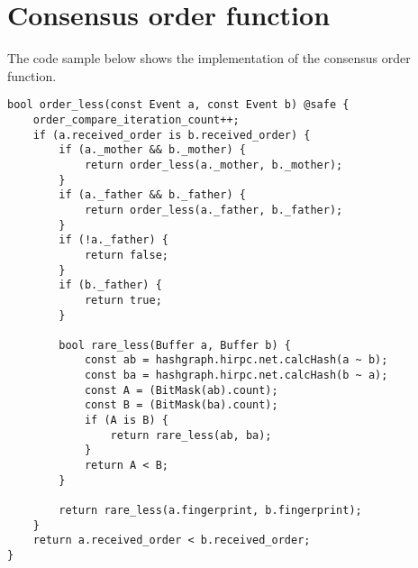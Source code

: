 \section{Consensus order function}\label{sec:order_function}
The code sample below shows the implementation of the consensus order function.
\lstset{language=c++, numbers=left, numberstyle=\tiny, stepnumber=1, numbersep=5pt, tabsize=4}%
\begin{lstlisting}
bool order_less(const Event a, const Event b) @safe {
	order_compare_iteration_count++;
	if (a.received_order is b.received_order) {
		if (a._mother && b._mother) {
			return order_less(a._mother, b._mother);
		}
		if (a._father && b._father) {
			return order_less(a._father, b._father);
		}
		if (!a._father) {
			return false;
		}
		if (b._father) {
			return true;
		}

		bool rare_less(Buffer a, Buffer b) {
			const ab = hashgraph.hirpc.net.calcHash(a ~ b);
			const ba = hashgraph.hirpc.net.calcHash(b ~ a);
			const A = (BitMask(ab).count);
			const B = (BitMask(ba).count);
			if (A is B) {
				return rare_less(ab, ba);
			}
			return A < B;
		}

		return rare_less(a.fingerprint, b.fingerprint);
	}
	return a.received_order < b.received_order;
}
\end{lstlisting}
